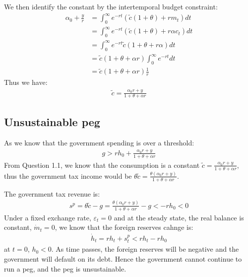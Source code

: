 \documentclass[a4paper,12pt]{article} %
\theoremstyle{nonitalic}
\begin{document}
We then identify the constant by the intertemporal budget constraint:
\begin{align*}
    \alpha_0 + \frac{y}{r} &= \int _0^{\infty} e^{-rt} \left(\tilde{c}(1+\theta) + r m_t \right) dt \\
    &= \int _0^{\infty} e^{-rt} \left(\tilde{c}(1+\theta) + r \alpha c_t \right) dt \\
    &= \int _0^{\infty} e^{-rt} \tilde{c}(1+\theta + r \alpha) dt \\
    &= \tilde{c} (1+\theta +\alpha r) \int _0^{\infty} e^{-rt} dt \\
    &= \tilde{c} (1+\theta +\alpha r) \frac{1}{r}
\end{align*}
Thus we have:
\begin{gather*}
    \tilde{c} = \frac{\alpha_0 r + y}{1 + \theta + \alpha r}
\end{gather*}



\subsection{Unsustainable peg}\label{sec:1.2}

As we know that the government spending is over a threshold:
\begin{gather*}
    g > r h_0 + \frac{\alpha_0 r + y}{1 + \theta + \alpha r}
\end{gather*}
From Question 1.1, we know that the consumption is a constant $\tilde{c} = \frac{\alpha_0 r + y}{1 + \theta + \alpha r}$,
thus the government tax income would be $\theta \tilde{c} = \frac{\theta (\alpha_0 r + y)}{1 + \theta + \alpha r} $.

The government tax revenue is:
\begin{gather*}
    s^p = \theta \tilde{c} - g = \frac{\theta (\alpha_0 r + y)}{1 + \theta + \alpha r} - g < -r h_0 < 0
\end{gather*}
Under a fixed exchange rate, $\varepsilon_t = 0$ and at the steady state, the real balance is constant, $\dot{m}_t = 0$,
we know that the foreign reserves cahnge is:
\begin{gather*}
    \dot{h}_t = r h_t + s_t^p < r h_t - r h_0
\end{gather*}
at $t=0$, $h_0 < 0$. As time passes, the foreign reserves will be negative and the government will default on its debt.
Hence the government cannot continue to run a peg, and the peg is unsustainable.
\end{document}
